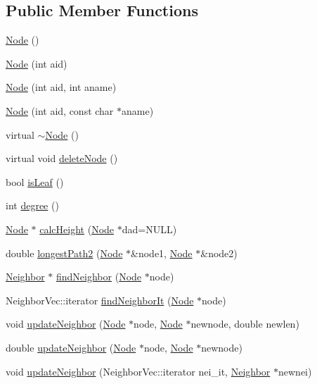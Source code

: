 \subsection*{Public Member Functions}
\begin{DoxyCompactItemize}
\item 
\hyperlink{classNode_ad7a34779cad45d997bfd6d3d8043c75f}{Node} ()
\item 
\hyperlink{classNode_af6165e50e0ce42c0cfad89e62066be69}{Node} (int aid)
\item 
\hyperlink{classNode_a5161742d57505f425fb3f8b8ab0c883e}{Node} (int aid, int aname)
\item 
\hyperlink{classNode_aa8da7627c64a07c011e78cd71d9d5f8e}{Node} (int aid, const char $\ast$aname)
\item 
virtual \hyperlink{classNode_aa0840c3cb5c7159be6d992adecd2097c}{$\sim$Node} ()
\item 
virtual void \hyperlink{classNode_aaccc6f1874a0ddf07d281270d9f9c301}{deleteNode} ()
\item 
bool \hyperlink{classNode_a3a61dca67d5ad06cacb8c48eb6374973}{isLeaf} ()
\item 
int \hyperlink{classNode_a83a14e84b986038eb444e8945849d127}{degree} ()
\item 
\hyperlink{classNode}{Node} $\ast$ \hyperlink{classNode_a1340ab80fa547e2f09e766a4c327f387}{calcHeight} (\hyperlink{classNode}{Node} $\ast$dad=NULL)
\item 
double \hyperlink{classNode_a327b0ab1379f0dc6ad4062e3b253dd6f}{longestPath2} (\hyperlink{classNode}{Node} $\ast$\&node1, \hyperlink{classNode}{Node} $\ast$\&node2)
\item 
\hyperlink{classNeighbor}{Neighbor} $\ast$ \hyperlink{classNode_a522b44457c22e6c97e7becfec43cbdba}{findNeighbor} (\hyperlink{classNode}{Node} $\ast$node)
\item 
NeighborVec::iterator \hyperlink{classNode_acb2b4563be11a48ec1503bb22a56893a}{findNeighborIt} (\hyperlink{classNode}{Node} $\ast$node)
\item 
void \hyperlink{classNode_a991931db235cedbcdae20bcb77a57671}{updateNeighbor} (\hyperlink{classNode}{Node} $\ast$node, \hyperlink{classNode}{Node} $\ast$newnode, double newlen)
\item 
double \hyperlink{classNode_ac0dce50c1942b6c015fb8a10695dcc5a}{updateNeighbor} (\hyperlink{classNode}{Node} $\ast$node, \hyperlink{classNode}{Node} $\ast$newnode)
\item 
void \hyperlink{classNode_ab45fa6addf881a2c6c090bbd9686710f}{updateNeighbor} (NeighborVec::iterator nei\_\-it, \hyperlink{classNeighbor}{Neighbor} $\ast$newnei)

\end{DoxyCompactItemize}

